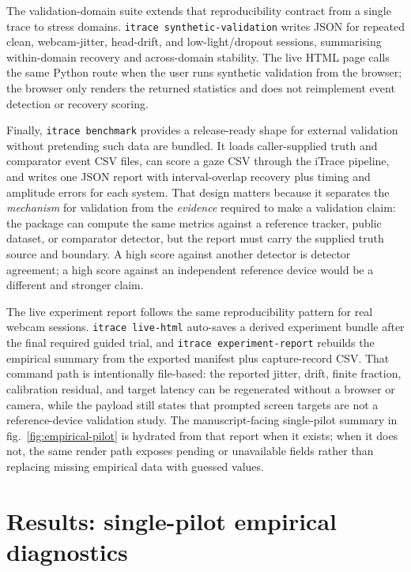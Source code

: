 \documentclass[
]{article}
\begin{document}
The validation-domain suite extends that reproducibility contract from a
single trace to stress domains. \texttt{itrace\ synthetic-validation}
writes JSON for repeated clean, webcam-jitter, head-drift, and
low-light/dropout sessions, summarising within-domain recovery and
across-domain stability. The live HTML page calls the same Python route
when the user runs synthetic validation from the browser; the browser
only renders the returned statistics and does not reimplement event
detection or recovery scoring.

Finally, \texttt{itrace\ benchmark} provides a release-ready shape for
external validation without pretending such data are bundled. It loads
caller-supplied truth and comparator event CSV files, can score a gaze
CSV through the iTrace pipeline, and writes one JSON report with
interval-overlap recovery plus timing and amplitude errors for each
system. That design matters because it separates the \emph{mechanism}
for validation from the \emph{evidence} required to make a validation
claim: the package can compute the same metrics against a reference
tracker, public dataset, or comparator detector, but the report must
carry the supplied truth source and boundary. A high score against
another detector is detector agreement; a high score against an
independent reference device would be a different and stronger claim.

The live experiment report follows the same reproducibility pattern for
real webcam sessions. \texttt{itrace\ live-html} auto-saves a derived
experiment bundle after the final required guided trial, and
\texttt{itrace\ experiment-report} rebuilds the empirical summary from
the exported manifest plus capture-record CSV. That command path is
intentionally file-based: the reported jitter, drift, finite fraction,
calibration residual, and target latency can be regenerated without a
browser or camera, while the payload still states that prompted screen
targets are not a reference-device validation study. The
manuscript-facing single-pilot summary in fig.~\ref{fig:empirical-pilot}
is hydrated from that report when it exists; when it does not, the same
render path exposes pending or unavailable fields rather than replacing
missing empirical data with guessed values.

\section{Results: single-pilot empirical
diagnostics}\label{sec:empirical-pilot}
\end{document}
